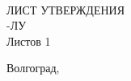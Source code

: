 {    \begin{center}
    \VSTUTitle\\
    \vspace{8mm}
    ЛИСТ УТВЕРЖДЕНИЯ\\
    \VSTULUCode-ЛУ\\
    Листов 1\\
    \vspace{\fill}
    \end{center}
    \begin{flushright}
    \VSTUTitleDirector
    \vfill
    \VSTUTitleImplementer
    \end{flushright}
    \vspace{\fill}
    \begin{center}
    Волгоград,~\the\year
    \end{center}
    \clearpage
    \pagestyle{plainhf}
}
